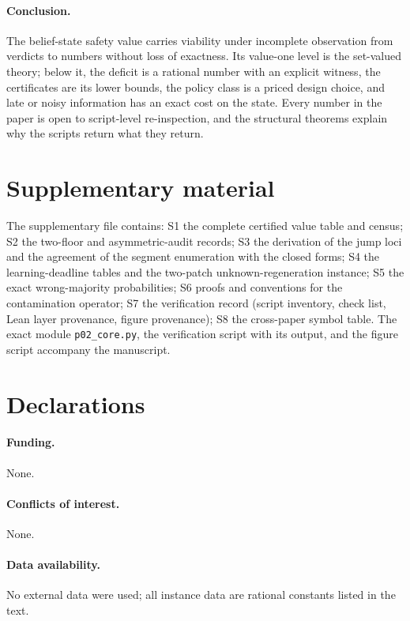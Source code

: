 \documentclass[11pt,a4paper]{article}
\theoremstyle{plain}
\theoremstyle{definition}
\theoremstyle{remark}
\begin{document}
\paragraph{Conclusion.}
The belief-state safety value carries viability under incomplete observation from verdicts to numbers without loss of exactness. Its value-one level is the set-valued theory; below it, the deficit is a rational number with an explicit witness, the certificates are its lower bounds, the policy class is a priced design choice, and late or noisy information has an exact cost on the state. Every number in the paper is open to script-level re-inspection, and the structural theorems explain why the scripts return what they return.
\section*{Supplementary material}
The supplementary file  contains: S1 the complete certified value table and census; S2 the two-floor and asymmetric-audit records; S3 the derivation of the jump loci and the agreement of the segment enumeration with the closed forms; S4 the learning-deadline tables and the two-patch unknown-regeneration instance; S5 the exact wrong-majority probabilities; S6 proofs and conventions for the contamination operator; S7 the verification record (script inventory, check list, Lean layer provenance, figure provenance); S8 the cross-paper symbol table. The exact module \texttt{p02\_core.py}, the verification script  with its output, and the figure script accompany the manuscript.

\section*{Declarations}
\paragraph{Funding.} None.
\paragraph{Conflicts of interest.} None.
\paragraph{Data availability.} No external data were used; all instance data are rational constants listed in the text.
\end{document}
